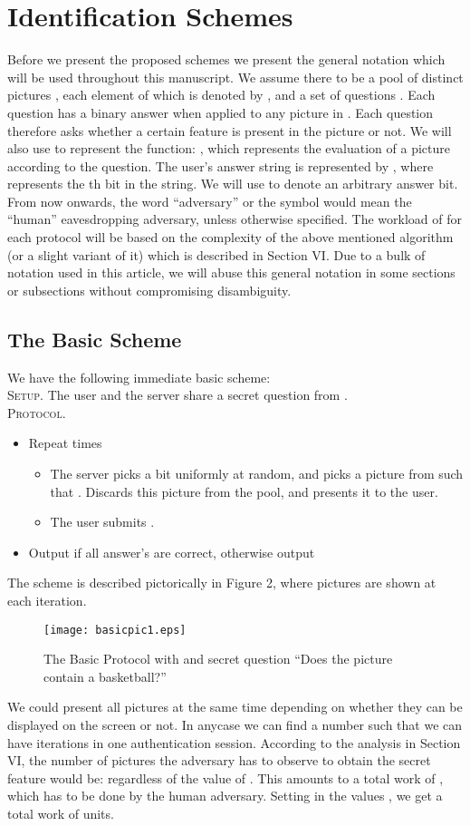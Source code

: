 \documentclass{llncs}
\begin{document}
\section{Identification Schemes}
Before we present the proposed schemes we present the general notation which will be used throughout this manuscript. We assume there to be a pool of distinct pictures , each element of which is denoted by , and a set of questions . Each question  has a binary answer when applied to any picture in . Each question therefore asks whether a certain feature is present in the picture or not. We will also use  to represent the function: , which represents the evaluation of a picture according to the question. The user's answer string is represented by , where  represents the th bit in the string. We will use  to denote an arbitrary answer bit. From now onwards, the word ``adversary'' or the symbol  would mean the ``human'' eavesdropping adversary, unless otherwise specified. The workload of  for each protocol will be based on the complexity of the above mentioned algorithm (or a slight variant of it) which is described in Section VI. Due to a bulk of notation used in this article, we will abuse this general notation in some sections or subsections without compromising disambiguity.
\subsection{The Basic Scheme}
We have the following immediate basic scheme:\\
\textsc{Setup.} The user and the server share a secret question  from .\\
\textsc{Protocol.}
\begin{itemize}
\item Repeat  times
	\begin{itemize}
	\item The server picks a bit  uniformly at random, and picks a picture  from  such that . Discards this picture from the pool, and presents it to the user.
	\item The user submits .
	\end{itemize}
\item Output  if all answer's are correct, otherwise output 
\end{itemize}

The scheme is described pictorically in Figure 2, where  pictures are shown at each iteration. 
\begin{figure}[ht]
\centerline{\texttt{[image: basicpic1.eps]}}
\caption{The Basic Protocol with  and secret question ``Does the picture contain a basketball?''}
\label{fig6}
\end{figure}
We could present all  pictures at the same time depending on whether they can be displayed on the screen or not. In anycase we can find a number  such that we can have 
iterations in one authentication session. According to the analysis in Section VI, the number of pictures the adversary has to observe to obtain the secret feature would be:  regardless of the value of . This amounts to a total work of , which has to be done by the human adversary. Setting in the values , we get a total work of  units.
\end{document}

